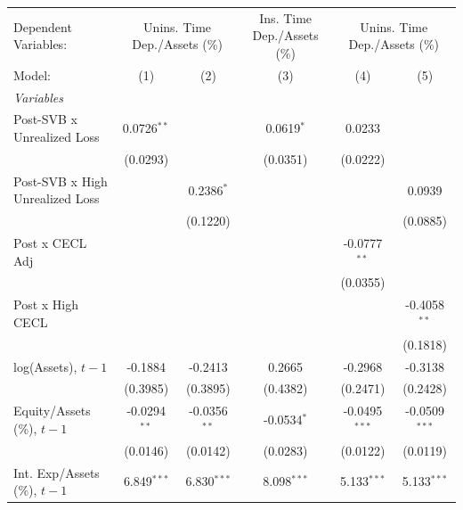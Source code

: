 
\begingroup
\centering
\begin{tabular}{lccccc}
   \tabularnewline \midrule \midrule
   Dependent Variables: & \multicolumn{2}{c}{Unins. Time Dep./Assets (\%)} & Ins. Time Dep./Assets (\%) & \multicolumn{2}{c}{Unins. Time Dep./Assets (\%)}\\
   Model:                          & (1)            & (2)            & (3)           & (4)             & (5)\\  
   \midrule
   \emph{Variables}\\
   Post-SVB x Unrealized Loss      & 0.0726$^{**}$  &                & 0.0619$^{*}$  & 0.0233          &   \\   
                                   & (0.0293)       &                & (0.0351)      & (0.0222)        &   \\   
   Post-SVB x High Unrealized Loss &                & 0.2386$^{*}$   &               &                 & 0.0939\\   
                                   &                & (0.1220)       &               &                 & (0.0885)\\   
   Post x CECL Adj                 &                &                &               & -0.0777$^{**}$  &   \\   
                                   &                &                &               & (0.0355)        &   \\   
   Post x High CECL                &                &                &               &                 & -0.4058$^{**}$\\   
                                   &                &                &               &                 & (0.1818)\\   
   log(Assets), $t{-}1$            & -0.1884        & -0.2413        & 0.2665        & -0.2968         & -0.3138\\   
                                   & (0.3985)       & (0.3895)       & (0.4382)      & (0.2471)        & (0.2428)\\   
   Equity/Assets (\%), $t{-}1$     & -0.0294$^{**}$ & -0.0356$^{**}$ & -0.0534$^{*}$ & -0.0495$^{***}$ & -0.0509$^{***}$\\   
                                   & (0.0146)       & (0.0142)       & (0.0283)      & (0.0122)        & (0.0119)\\   
   Int. Exp/Assets (\%), $t{-}1$   & 6.849$^{***}$  & 6.830$^{***}$  & 8.098$^{***}$ & 5.133$^{***}$   & 5.133$^{***}$\\   

\end{tabular}
